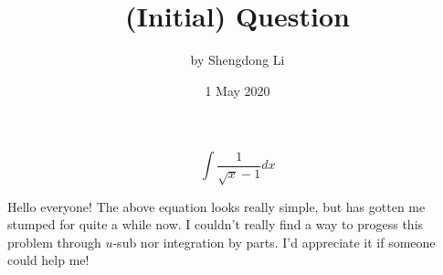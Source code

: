 \documentclass[letterpaper, 12pt]{article}
\begin{document}
\title{(Initial) Question}
\author{by Shengdong Li}
\date{1 May 2020}
\maketitle
$$
    \int\frac{1}{\sqrt{x}-1}dx
$$
\bigskip
\par
Hello everyone! The above equation looks really simple, but has gotten me stumped for quite a while now. I couldn't really find a way to progess this problem through $u$-sub nor integration by parts. I'd appreciate it if someone could help me! 
\end{document}
